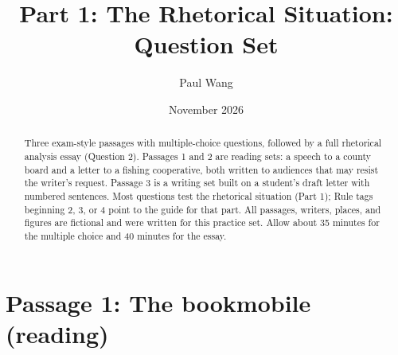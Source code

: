 \documentclass[11pt]{article}
\title{Part 1: The Rhetorical Situation: Question Set}
\author{Paul Wang}
\date{November 2026}
\begin{document}
\maketitle

\begin{abstract}
Three exam-style passages with multiple-choice questions, followed by a full rhetorical analysis essay (Question 2). Passages 1 and 2 are reading sets: a speech to a county board and a letter to a fishing cooperative, both written to audiences that may resist the writer's request. Passage 3 is a writing set built on a student's draft letter with numbered sentences. Most questions test the rhetorical situation (Part 1); Rule tags beginning 2, 3, or 4 point to the guide for that part. All passages, writers, places, and figures are fictional and were written for this practice set. Allow about 35 minutes for the multiple choice and 40 minutes for the essay.
\end{abstract}


\section{Passage 1: The bookmobile (reading)}
\end{document}
